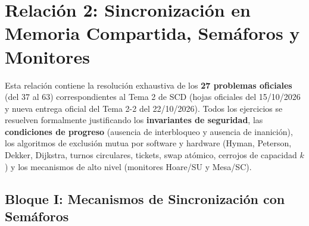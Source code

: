\chapter{Relación 2: Sincronización en Memoria Compartida, Semáforos y Monitores}
\label{cap:relacion2}


\begin{aviso}
Esta relación contiene la resolución exhaustiva de los \textbf{27 problemas oficiales} (del 37 al 63) correspondientes al Tema 2 de SCD (hojas oficiales del 15/10/2026 y nueva entrega oficial del Tema 2-2 del 22/10/2026).
Todos los ejercicios se resuelven formalmente justificando los \textbf{invariantes de seguridad}, las \textbf{condiciones de progreso} (ausencia de interbloqueo y ausencia de inanición), los algoritmos de exclusión mutua por software y hardware (Hyman, Peterson, Dekker, Dijkstra, turnos circulares, tickets, swap atómico, cerrojos de capacidad $k$) y los mecanismos de alto nivel (monitores Hoare/SU y Mesa/SC).
\end{aviso}

\section{Bloque I: Mecanismos de Sincronización con Semáforos}

